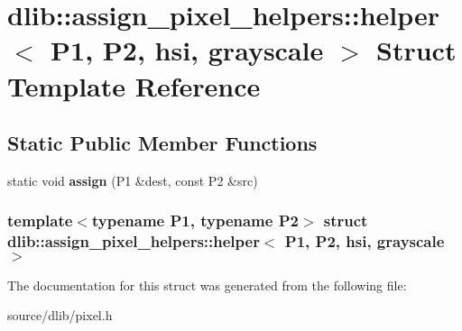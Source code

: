 \hypertarget{structdlib_1_1assign__pixel__helpers_1_1helper_3_01P1_00_01P2_00_01hsi_00_01grayscale_01_4}{
\section{dlib::assign\_\-pixel\_\-helpers::helper$<$ P1, P2, hsi, grayscale $>$ Struct Template Reference}
\label{structdlib_1_1assign__pixel__helpers_1_1helper_3_01P1_00_01P2_00_01hsi_00_01grayscale_01_4}
}
\subsection*{Static Public Member Functions}
\begin{DoxyCompactItemize}
\item 
\hypertarget{structdlib_1_1assign__pixel__helpers_1_1helper_3_01P1_00_01P2_00_01hsi_00_01grayscale_01_4_a5b6e835faa29df34cd4cfc29e5da0580}{
static void {\bfseries assign} (P1 \&dest, const P2 \&src)}
\label{structdlib_1_1assign__pixel__helpers_1_1helper_3_01P1_00_01P2_00_01hsi_00_01grayscale_01_4_a5b6e835faa29df34cd4cfc29e5da0580}

\end{DoxyCompactItemize}
\subsubsection*{template$<$typename P1, typename P2$>$ struct dlib::assign\_\-pixel\_\-helpers::helper$<$ P1, P2, hsi, grayscale $>$}



The documentation for this struct was generated from the following file:\begin{DoxyCompactItemize}
\item 
source/dlib/pixel.h\end{DoxyCompactItemize}
